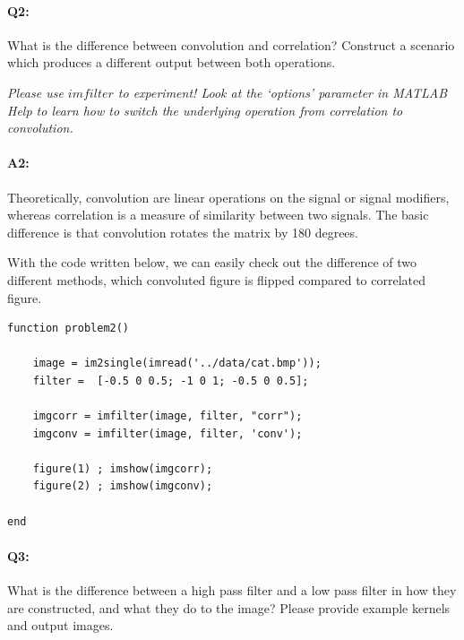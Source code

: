 	
	
	
	\pagebreak
	\paragraph{Q2:} What is the difference between convolution and correlation? Construct a scenario which produces a different output between both operations.
	
	\emph{Please use \href{https://www.mathworks.com/help/images/ref/imfilter.html}{$imfilter$} to experiment! Look at the `options' parameter in MATLAB Help to learn how to switch the underlying operation from correlation to convolution.}
	
	\paragraph{A2:} Theoretically, convolution are linear operations on the signal or signal modifiers, whereas correlation is a measure of similarity between two signals. The basic difference is that convolution rotates the matrix by 180 degrees. 
	
	With the code written below, we can easily check out the difference of two different methods, which convoluted figure is flipped compared to correlated figure.
	
	\begin{lstlisting}[style=Matlab-editor]
function problem2()

    image = im2single(imread('../data/cat.bmp'));
    filter =  [-0.5 0 0.5; -1 0 1; -0.5 0 0.5];
    
    imgcorr = imfilter(image, filter, "corr");
    imgconv = imfilter(image, filter, 'conv');
    
    figure(1) ; imshow(imgcorr);
    figure(2) ; imshow(imgconv);

end
\end{lstlisting}
	
	
	
	
	\pagebreak
	\paragraph{Q3:} What is the difference between a high pass filter and a low pass filter in how they are constructed, and what they do to the image? Please provide example kernels and output images.
	

